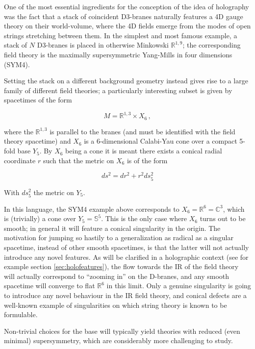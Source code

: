 \label{chap:cones}One of the most essential ingredients for the conception of the idea of holography was the fact that a stack of coincident D3-branes naturally features a 4D gauge theory on their world-volume, where the 4D fields emerge from the modes of open strings stretching between them. In the simplest and most famous example, a stack of $N$ D3-branes is placed in otherwise Minkowski $\mathbb{R}^{1,9}$; the corresponding field theory is the maximally supersymmetric Yang-Mills in four dimensions (SYM4).

Setting the stack on a different background geometry instead gives rise to a large family of different field theories; a particularly interesting subset is given by spacetimes of the form

\begin{equation} 
	M = \mathbb{R}^{1,3} \times X_6 \,,
\end{equation}

where the $\mathbb{R}^{1,3}$ is parallel to the branes (and must be identified with the field theory spacetime) and $X_6$ is a 6-dimensional Calabi-Yau cone over a compact 5-fold base $Y_5$. By $X_6$ being a cone it is meant there exists a conical radial coordinate $r$ such that the metric on $X_6$ is of the form

\begin{equation}
	ds^2 = dr^2 + r^2 ds_5^2
	\label{}
\end{equation}

With $ds_5^2$ the metric on $Y_5$.

In this language, the SYM4 example above corresponds to $X_6 = \mathbb{R}^6 = \mathbb{C}^3$, which is (trivially) a cone over $Y_5 = \mathbb{S}^5$. This is the only case where $X_6$ turns out to be smooth; in general it will feature a conical singularity in the origin. The motivation for jumping so hastily to a generalization as radical as a singular spacetime, instead of other smooth spacetimes, is that the latter will not actually introduce any novel features. As will be clarified in a holographic context (see for example section \ref{sec:holofeatures}), the flow towards the IR of the field theory will actually correspond to ``zooming in'' on the D-branes, and any smooth spacetime will converge to flat $\mathbb{R}^6$ in this limit. Only a genuine singularity is going to introduce any novel behaviour in the IR field theory, and conical defects are a well-known example of singularities on which string theory is known to be formulable\cite{idk}.

Non-trivial choices for the base will typically yield theories with reduced (even minimal) supersymmetry, which are considerably more challenging to study.

